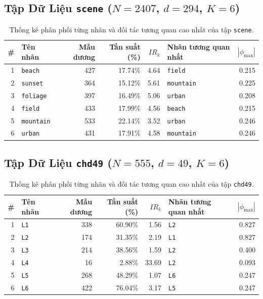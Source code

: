 \documentclass[11pt,a4paper]{article}
\begin{document}
\subsection{Tập Dữ Liệu \texttt{scene} ($N=2407$, $d=294$, $K=6$)}
\begin{table}[htbp]
\centering
\footnotesize
\caption{Thống kê phân phối từng nhãn và đối tác tương quan cao nhất của tập \texttt{scene}.}
\begin{tabularx}{0.95\textwidth}{r l r r r l r}
\toprule
\textbf{\#} & \textbf{Tên nhãn} & \textbf{Mẫu dương} & \textbf{Tần suất (\%)} & \textbf{$IR_k$} & \textbf{Nhãn tương quan nhất} & \textbf{$|\phi_{\max}|$} \\
\midrule
1 & \texttt{beach} & 427 & 17.74\% & 4.64 & \texttt{field} & 0.215 \\
2 & \texttt{sunset} & 364 & 15.12\% & 5.61 & \texttt{mountain} & 0.225 \\
3 & \texttt{foliage} & 397 & 16.49\% & 5.06 & \texttt{urban} & 0.208 \\
4 & \texttt{field} & 433 & 17.99\% & 4.56 & \texttt{beach} & 0.215 \\
5 & \texttt{mountain} & 533 & 22.14\% & 3.52 & \texttt{urban} & 0.246 \\
6 & \texttt{urban} & 431 & 17.91\% & 4.58 & \texttt{mountain} & 0.246 \\
\bottomrule
\end{tabularx}
\end{table}

\subsection{Tập Dữ Liệu \texttt{chd49} ($N=555$, $d=49$, $K=6$)}
\begin{table}[htbp]
\centering
\footnotesize
\caption{Thống kê phân phối từng nhãn và đối tác tương quan cao nhất của tập \texttt{chd49}.}
\begin{tabularx}{0.95\textwidth}{r l r r r l r}
\toprule
\textbf{\#} & \textbf{Tên nhãn} & \textbf{Mẫu dương} & \textbf{Tần suất (\%)} & \textbf{$IR_k$} & \textbf{Nhãn tương quan nhất} & \textbf{$|\phi_{\max}|$} \\
\midrule
1 & \texttt{L1} & 338 & 60.90\% & 1.56 & \texttt{L2} & 0.827 \\
2 & \texttt{L2} & 174 & 31.35\% & 2.19 & \texttt{L1} & 0.827 \\
3 & \texttt{L3} & 214 & 38.56\% & 1.59 & \texttt{L2} & 0.400 \\
4 & \texttt{L4} & 16 & 2.88\% & 33.69 & \texttt{L2} & 0.093 \\
5 & \texttt{L5} & 268 & 48.29\% & 1.07 & \texttt{L6} & 0.247 \\
6 & \texttt{L6} & 422 & 76.04\% & 3.17 & \texttt{L5} & 0.247 \\
\bottomrule
\end{tabularx}
\end{table}
\end{document}
